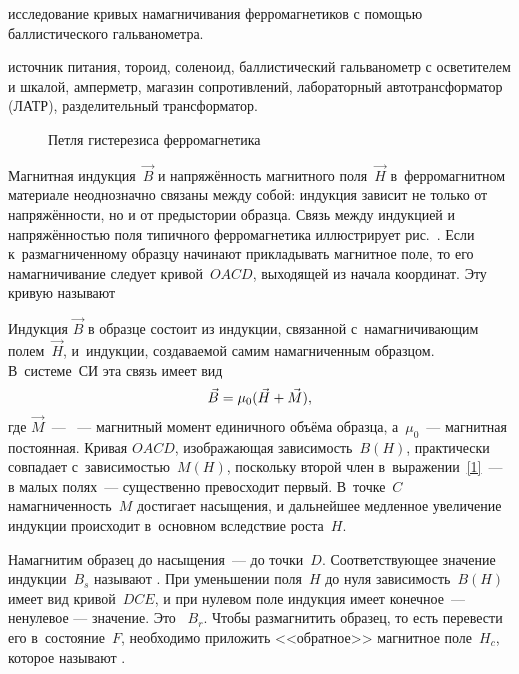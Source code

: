 
\begin{lab:aim}
	исследование кривых намагничивания ферромагнетиков с помощью баллистического гальванометра.
\end{lab:aim}

\begin{lab:equipment}
	источник питания, тороид, соленоид, баллистический гальванометр с осветителем и шкалой, 
	амперметр, магазин сопротивлений, лабораторный автотрансформатор (ЛАТР), разделительный трансформатор.
\end{lab:equipment}


\begin{wrapfigure}[15]{r}{0.4\textwidth}
	\caption{Петля гистерезиса ферромагнетика}
\end{wrapfigure}


Магнитная индукция~$\vec{B}$ и напряжённость магнитного поля~$\vec{H}$ в~ферромагнитном материале неоднозначно связаны между
собой: индукция зависит не только от напряжённости, но и от предыстории образца. Связь между индукцией и напряжённостью
поля типичного ферромагнетика иллюстрирует рис.~. Если к~размагниченному образцу начинают прикладывать магнитное поле,
то его намагничивание следует кривой~$OACD$, выходящей из начала координат. Эту кривую называют 

Индукция $\vec{B}$ в образце состоит из индукции, связанной с~намагничивающим полем~$\vec{H}$, и~индукции, создаваемой самим
намагниченным образцом. В~системе~СИ эта связь имеет вид
\begin{equation}
	\eqmark{1}
	\vec{B}=\mu_0(\vec{H}+\vec{M}),
\end{equation}
где $\vec{M}$~--- ~--- магнитный момент единичного объёма образца, а~$\mu_0$~--- магнитная
постоянная. Кривая $OACD$, изображающая зависимость~$B(H)$, практически совпадает с~зависимостью~$M(H)$, поскольку
второй член в~выражении~\eqref{1}~--- в малых полях~--- существенно превосходит первый. В~точке~$C$ намагниченность~$M$
достигает насыщения, и дальнейшее медленное увеличение индукции происходит в~основном вследствие роста~$H$.

Намагнитим образец до насыщения~--- до точки~$D$. Соответствующее значение индукции~$B_s$ называют . При уменьшении поля~$H$ до нуля зависимость~$B(H)$ имеет вид кривой~$DCE$, и при нулевом поле индукция имеет
конечное~--- ненулевое --- значение. Это ~$B_r$. Чтобы размагнитить образец, то есть перевести
его в~состояние~$F$, необходимо приложить <<обратное>> магнитное поле~$H_c$, которое называют .

